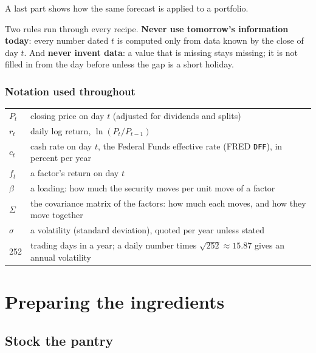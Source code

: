 \documentclass[11pt,a4paper]{article}
\newcommand{\ann}{\sqrt{252}}
\begin{document}
A last part shows how the same forecast is applied to a portfolio.

\begin{tip}
Two rules run through every recipe. \textbf{Never use tomorrow's information
today}: every number dated $t$ is computed only from data known by the close of
day $t$. And \textbf{never invent data}: a value that is missing stays missing; it is
not filled in from the day before unless the gap is a short holiday.
\end{tip}

\subsubsection*{Notation used throughout}

\begin{tabularx}{\linewidth}{@{}lX@{}}
\toprule
$P_t$ & closing price on day $t$ (adjusted for dividends and splits) \\
$r_t$ & daily log return, $\ln(P_t/P_{t-1})$ \\
$c_t$ & cash rate on day $t$, the Federal Funds effective rate (FRED \texttt{DFF}), in percent per year \\
$f_t$ & a factor's return on day $t$ \\
$\beta$ & a loading: how much the security moves per unit move of a factor \\
$\Sigma$ & the covariance matrix of the factors: how much each moves, and how they move together \\
$\sigma$ & a volatility (standard deviation), quoted per year unless stated \\
252 & trading days in a year; a daily number times $\ann \approx 15.87$ gives an annual volatility \\
\bottomrule
\end{tabularx}

\section{Preparing the ingredients}

\subsection{Stock the pantry}
\end{document}
